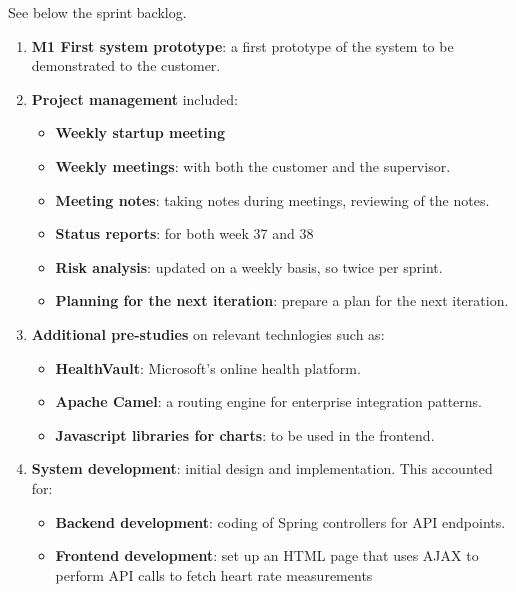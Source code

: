 See below the sprint backlog.
\begin{enumerate}[1.]
	\item \textbf{M1 First system prototype}:\newline
		a first prototype of the system to be demonstrated to the customer.
	\item \textbf{Project management} included:
		\begin{itemize}
			\item \textbf{Weekly startup meeting}
			\item \textbf{Weekly meetings}:
				with both the customer and the supervisor.
			\item \textbf{Meeting notes}:
				taking notes during meetings, reviewing of the notes.
			\item \textbf{Status reports}:
				for both week 37 and 38
			\item \textbf{Risk analysis}:
				updated on a weekly basis, so twice per sprint.
			\item \textbf{Planning for the next iteration}:
				prepare a plan for the next iteration.
		\end{itemize}
	\item \textbf{Additional pre-studies} on relevant technlogies such as:
	\begin{itemize}
		\item \textbf{HealthVault}: Microsoft's online health platform.
		\item \textbf{Apache Camel}: a routing engine for enterprise integration patterns.
		\item \textbf{Javascript libraries for charts}: to be used in the frontend.
	\end{itemize}
	\item \textbf{System development}: initial design and implementation. This accounted for:
	\begin{itemize}
		\item \textbf{Backend development}:
			coding of Spring controllers for API endpoints.
		\item \textbf{Frontend development}:
			set up an HTML page that uses AJAX to perform API calls to fetch heart rate measurements

\end{itemize}
\end{enumerate}
